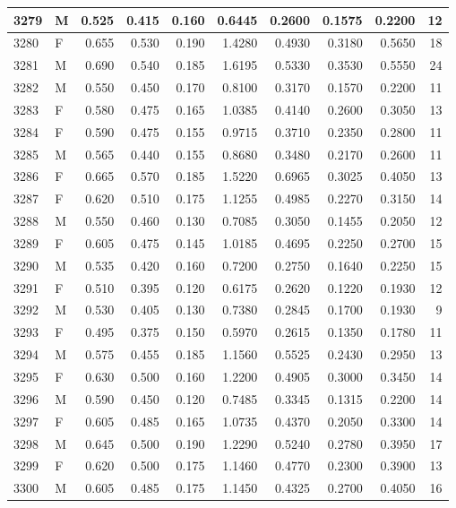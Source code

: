 \documentclass[9pt,twocolumn,twoside,]{pnas-new}
\begin{document}
\begin{tabular}{l|l|r|r|r|r|r|r|r|r}
\hline
3279 & M & 0.525 & 0.415 & 0.160 & 0.6445 & 0.2600 & 0.1575 & 0.2200 & 12\\
\hline
3280 & F & 0.655 & 0.530 & 0.190 & 1.4280 & 0.4930 & 0.3180 & 0.5650 & 18\\
\hline
3281 & M & 0.690 & 0.540 & 0.185 & 1.6195 & 0.5330 & 0.3530 & 0.5550 & 24\\
\hline
3282 & M & 0.550 & 0.450 & 0.170 & 0.8100 & 0.3170 & 0.1570 & 0.2200 & 11\\
\hline
3283 & F & 0.580 & 0.475 & 0.165 & 1.0385 & 0.4140 & 0.2600 & 0.3050 & 13\\
\hline
3284 & F & 0.590 & 0.475 & 0.155 & 0.9715 & 0.3710 & 0.2350 & 0.2800 & 11\\
\hline
3285 & M & 0.565 & 0.440 & 0.155 & 0.8680 & 0.3480 & 0.2170 & 0.2600 & 11\\
\hline
3286 & F & 0.665 & 0.570 & 0.185 & 1.5220 & 0.6965 & 0.3025 & 0.4050 & 13\\
\hline
3287 & F & 0.620 & 0.510 & 0.175 & 1.1255 & 0.4985 & 0.2270 & 0.3150 & 14\\
\hline
3288 & M & 0.550 & 0.460 & 0.130 & 0.7085 & 0.3050 & 0.1455 & 0.2050 & 12\\
\hline
3289 & F & 0.605 & 0.475 & 0.145 & 1.0185 & 0.4695 & 0.2250 & 0.2700 & 15\\
\hline
3290 & M & 0.535 & 0.420 & 0.160 & 0.7200 & 0.2750 & 0.1640 & 0.2250 & 15\\
\hline
3291 & F & 0.510 & 0.395 & 0.120 & 0.6175 & 0.2620 & 0.1220 & 0.1930 & 12\\
\hline
3292 & M & 0.530 & 0.405 & 0.130 & 0.7380 & 0.2845 & 0.1700 & 0.1930 & 9\\
\hline
3293 & F & 0.495 & 0.375 & 0.150 & 0.5970 & 0.2615 & 0.1350 & 0.1780 & 11\\
\hline
3294 & M & 0.575 & 0.455 & 0.185 & 1.1560 & 0.5525 & 0.2430 & 0.2950 & 13\\
\hline
3295 & F & 0.630 & 0.500 & 0.160 & 1.2200 & 0.4905 & 0.3000 & 0.3450 & 14\\
\hline
3296 & M & 0.590 & 0.450 & 0.120 & 0.7485 & 0.3345 & 0.1315 & 0.2200 & 14\\
\hline
3297 & F & 0.605 & 0.485 & 0.165 & 1.0735 & 0.4370 & 0.2050 & 0.3300 & 14\\
\hline
3298 & M & 0.645 & 0.500 & 0.190 & 1.2290 & 0.5240 & 0.2780 & 0.3950 & 17\\
\hline
3299 & F & 0.620 & 0.500 & 0.175 & 1.1460 & 0.4770 & 0.2300 & 0.3900 & 13\\
\hline
3300 & M & 0.605 & 0.485 & 0.175 & 1.1450 & 0.4325 & 0.2700 & 0.4050 & 16\\

\end{tabular}
\end{document}

